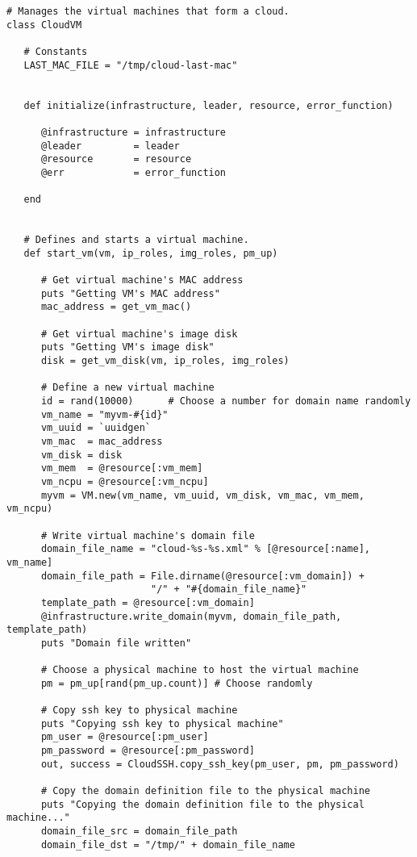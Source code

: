 \begin{lstlisting}
# Manages the virtual machines that form a cloud.
class CloudVM

   # Constants
   LAST_MAC_FILE = "/tmp/cloud-last-mac"


   def initialize(infrastructure, leader, resource, error_function)

      @infrastructure = infrastructure
      @leader         = leader
      @resource       = resource
      @err            = error_function

   end


   # Defines and starts a virtual machine.
   def start_vm(vm, ip_roles, img_roles, pm_up)
      
      # Get virtual machine's MAC address
      puts "Getting VM's MAC address"
      mac_address = get_vm_mac()
      
      # Get virtual machine's image disk
      puts "Getting VM's image disk"
      disk = get_vm_disk(vm, ip_roles, img_roles)
      
      # Define a new virtual machine
      id = rand(10000)      # Choose a number for domain name randomly
      vm_name = "myvm-#{id}"
      vm_uuid = `uuidgen`
      vm_mac  = mac_address
      vm_disk = disk
      vm_mem  = @resource[:vm_mem]
      vm_ncpu = @resource[:vm_ncpu]
      myvm = VM.new(vm_name, vm_uuid, vm_disk, vm_mac, vm_mem, vm_ncpu)
      
      # Write virtual machine's domain file
      domain_file_name = "cloud-%s-%s.xml" % [@resource[:name], vm_name]
      domain_file_path = File.dirname(@resource[:vm_domain]) + 
                         "/" + "#{domain_file_name}"
      template_path = @resource[:vm_domain]
      @infrastructure.write_domain(myvm, domain_file_path, template_path)
      puts "Domain file written"
      
      # Choose a physical machine to host the virtual machine
      pm = pm_up[rand(pm_up.count)] # Choose randomly
      
      # Copy ssh key to physical machine
      puts "Copying ssh key to physical machine"
      pm_user = @resource[:pm_user]
      pm_password = @resource[:pm_password]
      out, success = CloudSSH.copy_ssh_key(pm_user, pm, pm_password)
      
      # Copy the domain definition file to the physical machine
      puts "Copying the domain definition file to the physical machine..."
      domain_file_src = domain_file_path
      domain_file_dst = "/tmp/" + domain_file_name
      

\end{lstlisting}
